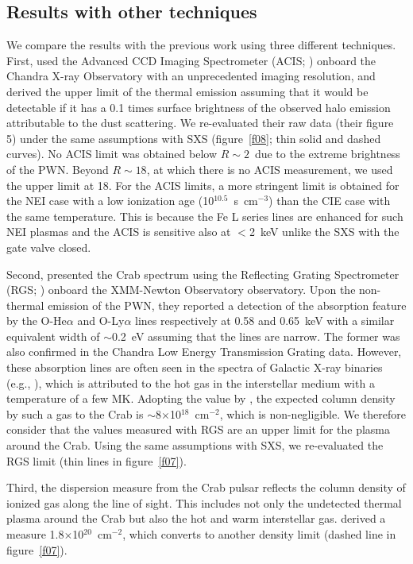 \documentclass[]{pasj01}
\begin{document}
\subsection{Results with other techniques}\label{s4-2}
We compare the results with the previous work using three different techniques. First,
\citet{seward06} used the Advanced CCD Imaging Spectrometer (ACIS; \cite{garmire03})
onboard the Chandra X-ray Observatory \citep{weisskopf02} with an unprecedented imaging
resolution, and derived the upper limit of the thermal emission assuming that it would
be detectable if it has a 0.1 times surface brightness of the observed halo emission
attributable to the dust scattering. We re-evaluated their raw data (their figure 5)
under the same assumptions with SXS (figure~\ref{f08}; thin solid and dashed curves). No
ACIS limit was obtained below $R \sim 2$\arcmin\ due to the extreme brightness of the
PWN. Beyond $R \sim 18$\arcmin, at which there is no ACIS measurement, we used the upper
limit at 18\arcmin. For the ACIS limits, a more stringent limit is obtained for the NEI
case with a low ionization age (10$^{10.5}$~s~cm$^{-3}$) than the CIE case with the same
temperature. This is because the Fe L series lines are enhanced for such NEI plasmas and
the ACIS is sensitive also at $<$2~keV unlike the SXS with the gate valve closed.

Second, \citet{kaastra09} presented the Crab spectrum using the Reflecting Grating
Spectrometer (RGS; \cite{denherder01}) onboard the XMM-Newton Observatory
\citep{jansen01} observatory. Upon the non-thermal emission of the PWN, they reported a
detection of the absorption feature by the O-He$\alpha$ and O-Ly$\alpha$ lines
respectively at 0.58 and 0.65~keV with a similar equivalent width of $\sim$0.2~eV
assuming that the lines are narrow. The former was also confirmed in the Chandra Low
Energy Transmission Grating data. However, these absorption lines are often seen in the
spectra of Galactic X-ray binaries (e.g., \cite{yao06a}), which is attributed to the hot
gas in the interstellar medium with a temperature of a few MK. Adopting the value by
\citet{sakai14}, the expected column density by such a gas to the Crab is
$\sim$8$\times$10$^{18}$~cm$^{-2}$, which is non-negligible. We therefore consider that
the values measured with RGS are an upper limit for the plasma around the Crab. Using
the same assumptions with SXS, we re-evaluated the RGS limit (thin lines in
figure~\ref{f07}).

Third, the dispersion measure from the Crab pulsar reflects the column density of
ionized gas along the line of sight. This includes not only the undetected thermal
plasma around the Crab but also the hot and warm interstellar gas. \citet{lundgren95}
derived a measure 1.8$\times$10$^{20}$~cm$^{-2}$, which converts to another density
limit (dashed line in figure~\ref{f07}).
\end{document}
